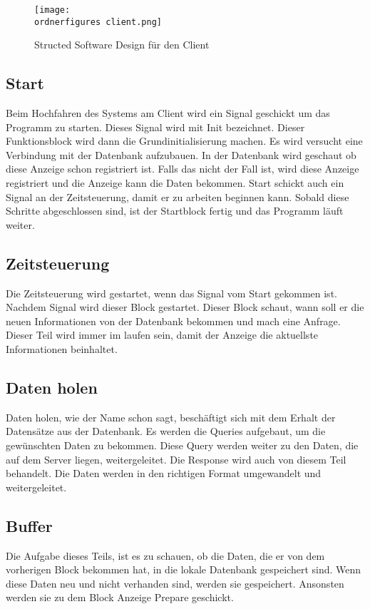\begin{figure}[ht]
	\centering
	\texttt{[image: \\ordnerfigures client.png]}
	\caption{Structed Software Design für den Client}
	\label{fi:structed_design_client}
\end{figure}

\subsection{Start}
Beim Hochfahren des Systems am Client wird ein Signal geschickt um das Programm zu starten. Dieses Signal wird mit Init bezeichnet. Dieser Funktionsblock wird dann die Grundinitialisierung machen. Es wird versucht eine Verbindung mit der Datenbank aufzubauen. In der Datenbank wird geschaut ob diese Anzeige schon registriert ist. Falls das nicht der Fall ist, wird diese Anzeige registriert und die Anzeige kann die Daten bekommen. Start schickt auch ein Signal an der Zeitsteuerung, damit er zu arbeiten beginnen kann. Sobald diese Schritte abgeschlossen sind, ist der Startblock fertig und das Programm l\"{a}uft weiter.

\subsection{Zeitsteuerung}
Die Zeitsteuerung wird gestartet, wenn das Signal vom Start gekommen ist. Nachdem Signal wird dieser Block gestartet. Dieser Block schaut, wann soll er die neuen Informationen von der Datenbank bekommen und mach eine Anfrage. Dieser Teil wird immer im laufen sein, damit der Anzeige die aktuellste Informationen beinhaltet.

\subsection{Daten holen}
Daten holen, wie der Name schon sagt, beschäftigt sich mit dem Erhalt der Datensätze aus der Datenbank. Es werden die Queries aufgebaut, um die gewünschten Daten zu bekommen. Diese Query werden weiter zu den Daten, die auf dem Server liegen, weitergeleitet. Die Response wird auch von diesem Teil behandelt. Die Daten werden in den richtigen Format umgewandelt und weitergeleitet.



\subsection{Buffer}
Die Aufgabe dieses Teils, ist es zu schauen, ob die Daten, die er von dem vorherigen Block bekommen hat, in die lokale Datenbank gespeichert sind. Wenn diese Daten neu und nicht verhanden sind, werden sie gespeichert. Ansonsten werden sie zu dem Block Anzeige Prepare geschickt.

